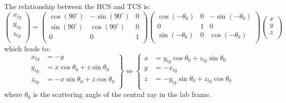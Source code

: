 The relationship between the HCS and TCS is:
\begin{equation}
    \begin{pmatrix}
	x_{tg}	\\
	y_{tg}	\\
	z_{tg}	\\
    \end{pmatrix}
    =
    \begin{pmatrix}
	\cos(90^\circ)   & -\sin(90^\circ)    & 0	\\
	\sin(90^\circ)   & \cos(90^\circ)     & 0	\\
	0   & 0     & 1	\\
    \end{pmatrix}
    \begin{pmatrix}
	\cos(-\theta_0)	& 0 & -\sin(-\theta_0)  \\
	0		& 1 & 0		\\
	\sin(-\theta_0)	& 0 & \cos(-\theta_0)  \\
    \end{pmatrix}
    \begin{pmatrix}
	x   \\
	y   \\
	z   \\
    \end{pmatrix}
\end{equation}
which leads to:
\begin{equation}
    \left.
    \begin{aligned}
	x_{tg}	&= -y	\\
	y_{tg}	&= x\cos\theta_0 + z\sin\theta_0    \\
	z_{tg}	&= -x\sin\theta_0 + z\cos\theta_0   \\
    \end{aligned}
    \right\}
    \iff
    \left\{
    \begin{aligned}
	x   &= y_{tg}\cos\theta_0 + z_{tg}\sin\theta_0	\\
	y   &= -x_{tg}	\\
	z   &= -y_{tg}\sin\theta_0 + z_{tg}\cos\theta_0   \\
    \end{aligned}
    \right.
\end{equation}
where $\theta_0$ is the scattering angle of the central ray in the lab frame.

